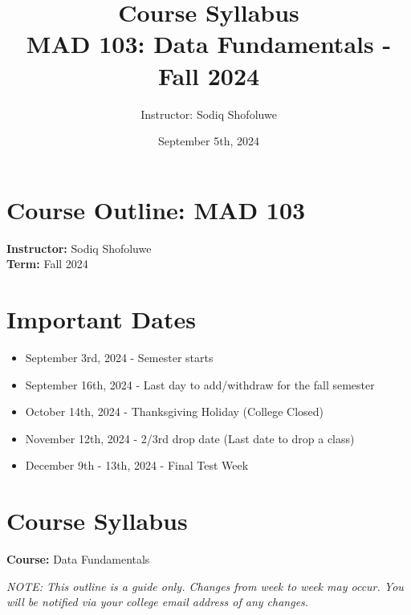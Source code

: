 \documentclass{article}
\title{Course Syllabus\\\large MAD 103: Data Fundamentals - Fall 2024}
\author{Instructor: Sodiq Shofoluwe}
\date{September 5th, 2024}
\begin{document}
\maketitle

\section*{Course Outline: MAD 103}
\textbf{Instructor:} Sodiq Shofoluwe \\
\textbf{Term:} Fall 2024

\section*{Important Dates}
\begin{itemize}
    \item September 3rd, 2024 - Semester starts
    \item September 16th, 2024 - Last day to add/withdraw for the fall semester
    \item October 14th, 2024 - Thanksgiving Holiday (College Closed)
    \item November 12th, 2024 - 2/3rd drop date (Last date to drop a class)
    \item December 9th - 13th, 2024 - Final Test Week
\end{itemize}

\section*{Course Syllabus}
\textbf{Course:} Data Fundamentals

\textit{NOTE: This outline is a guide only. Changes from week to week may occur. You will be notified via your college email address of any changes.}
\end{document}
